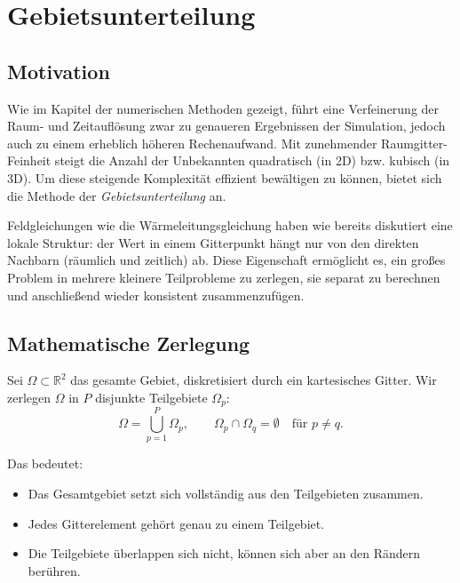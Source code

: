 %
%
%
\section{Gebietsunterteilung}
\label{parallelisierung:sec:dd}

\subsection{Motivation}

Wie im Kapitel der numerischen Methoden gezeigt, führt eine Verfeinerung der Raum- und Zeitauflösung zwar zu genaueren Ergebnissen der Simulation, jedoch auch zu einem erheblich höheren Rechenaufwand. 
Mit zunehmender Raumgitter-Feinheit steigt die Anzahl der Unbekannten quadratisch (in 2D) bzw. kubisch (in 3D).  
Um diese steigende Komplexität effizient bewältigen zu können, bietet sich die Methode der \emph{Gebietsunterteilung} an.

Feldgleichungen wie die Wärmeleitungsgleichung haben wie bereits diskutiert eine lokale Struktur: 
der Wert in einem Gitterpunkt hängt nur von den direkten Nachbarn (räumlich und zeitlich) ab.  
Diese Eigenschaft ermöglicht es, ein großes Problem in mehrere kleinere Teilprobleme zu zerlegen, sie separat zu berechnen und anschließend wieder konsistent zusammenzufügen.



\subsection{Mathematische Zerlegung}

Sei $\Omega \subset \mathbb{R}^2$ das gesamte Gebiet, diskretisiert durch ein kartesisches Gitter.  
Wir zerlegen $\Omega$ in $P$ disjunkte Teilgebiete $\Omega_p$:
\begin{equation}
	\Omega = \bigcup_{p=1}^P \Omega_p,
	\qquad 
	\Omega_p \cap \Omega_q = \emptyset \quad \text{für } p \neq q.
\end{equation}

Das bedeutet:
\begin{itemize}
	\item Das Gesamtgebiet setzt sich vollständig aus den Teilgebieten zusammen.
	\item Jedes Gitterelement gehört genau zu einem Teilgebiet.
	\item Die Teilgebiete überlappen sich nicht, können sich aber an den Rändern berühren.
\end{itemize}

